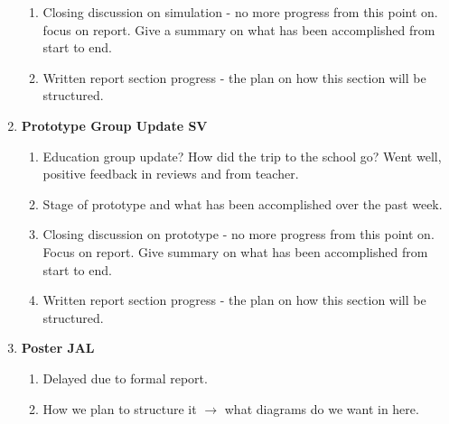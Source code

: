 \begin{enumerate}
\begin{enumerate}
\item  Closing discussion on simulation - no more progress from this point on. focus on report. Give a summary on what has been accomplished from start to end.

\item  Written report section progress - the plan on how this section will be structured.

\end{enumerate}

\item  \textbf{Prototype Group Update SV}

\begin{enumerate}
\item Education group update? How did the trip to the school go? Went well, positive feedback in reviews and from teacher.

\item  Stage of prototype and what has been accomplished over the past week.

\item  Closing discussion on prototype - no more progress from this point on.  Focus on report. Give summary on what has been accomplished from start to end.

\item  Written report section progress - the plan on how this section will be structured.
\end{enumerate}


\item  \textbf{Poster JAL}

\begin{enumerate}
\item Delayed due to formal report. 

\item  How we plan to structure it  $\mathrm{\to}$ what diagrams do we want in here.  
\end{enumerate}

\end{enumerate}


